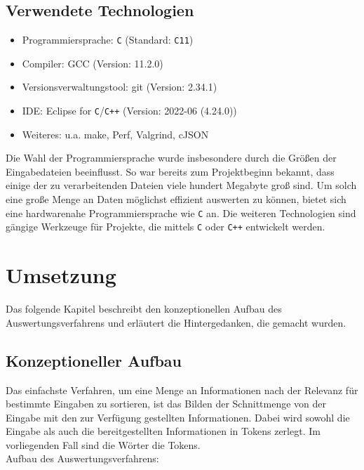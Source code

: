 \documentclass[a4paper,10pt]{article}
\begin{document}
    \subsection{Verwendete Technologien}
        \begin{itemize}
            \item Programmiersprache: \texttt{C} (Standard: \texttt{C11})
            \item Compiler: GCC (Version: 11.2.0)
            \item Versionsverwaltungstool: git (Version: 2.34.1)
            \item IDE: Eclipse for \texttt{C}/\texttt{C++} (Version: 2022-06 (4.24.0))
            \item Weiteres: u.a. make, Perf, Valgrind, cJSON
        \end{itemize}
        Die Wahl der Programmiersprache wurde insbesondere durch die Größen der Eingabedateien beeinflusst. So war bereits zum Projektbeginn bekannt, dass einige der zu verarbeitenden Dateien viele hundert Megabyte groß sind. Um solch eine große Menge an Daten möglichst effizient auswerten zu können, bietet sich eine hardwarenahe Programmiersprache wie \texttt{C} an. Die weiteren Technologien sind gängige Werkzeuge für Projekte, die mittels \texttt{C} oder \texttt{C++} entwickelt werden.


\section{Umsetzung}
    Das folgende Kapitel beschreibt den konzeptionellen Aufbau des Auswertungsverfahrens und erläutert die Hintergedanken, die gemacht wurden.

    \subsection{Konzeptioneller Aufbau}
        Das einfachste Verfahren, um eine Menge an Informationen nach der Relevanz für bestimmte Eingaben zu sortieren, ist das Bilden der Schnittmenge von der Eingabe mit den zur Verfügung gestellten Informationen. Dabei wird sowohl die Eingabe als auch die bereitgestellten Informationen in Tokens zerlegt. Im vorliegenden Fall sind die Wörter die Tokens.\\

        Aufbau des Auswertungsverfahrens:\\ \\
\end{document}

